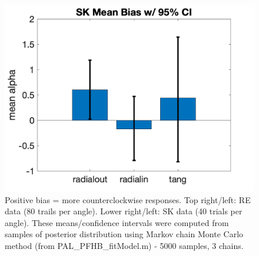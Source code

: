 \documentclass[11pt]{article} %
\begin{document}
\begin{figure}[H]
\includegraphics[scale=.2]{Images/MeanBiasError_95ci_SK.png}
\caption{Positive bias = more counterclockwise responses. Top right/left: RE data (80 trails per angle). Lower right/left: SK data (40 trials per angle). These means/confidence intervals were computed from samples of posterior distribution using Markov chain Monte Carlo method (from PAL\_PFHB\_fitModel.m) - 5000 samples, 3 chains.}
\end{figure}

\newpage
\end{document}
